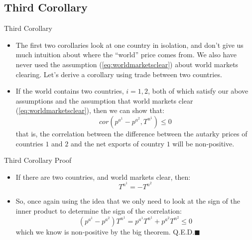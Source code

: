 \documentclass[aspectratio=169]{beamer}
\begin{document}

\subsection{Third Corollary}


\begin{frame}{Third Corollary}

\begin{itemize}
    \item<1-> The first two corollaries look at one country in isolation, and don’t give us much intuition about where the “world” price comes from.  We also have never used the assumption (\ref{eq:worldmarketsclear}) about world markets clearing.  Let’s derive a corollary using trade between two countries.
    \item<2-> If the world contains two countries, $ i = 1, 2 $, both of which satisfy our above assumptions and the assumption that world markets clear (\ref{eq:worldmarketsclear}), then we can show that:
    \begin{equation*}
        cor\left( p^{a^{1}} - p^{a^{2}}, T^{n^{1}} \right) \le 0
    \end{equation*}
    that is, the correlation between the difference between the autarky prices of countries $ 1 $ and $ 2 $ and the net exports of country $ 1 $ will be non-positive.
\end{itemize}
    
\end{frame}


\begin{frame}{Third Corollary Proof}

\begin{itemize}
    \item<1-> If there are two countries, and world markets clear, then:
    \begin{equation*}
        T^{n^{1}} = - T^{n^{2}}
    \end{equation*}
    \item<2-> So, once again using the idea that we only need to look at the sign of the inner product to determine the sign of the correlation:
    \begin{equation*}
        \left( p^{a^{1}} - p^{a^{2}}\right) T^{n^{1}} = p^{a^{1}} T^{n^{1}} + p^{a^{2}} T^{n^{2}} \le 0 
    \end{equation*}
    which we know is non-positive by the big theorem.  Q.E.D.$ \blacksquare $
\end{itemize}
    
\end{frame}
\end{document}
